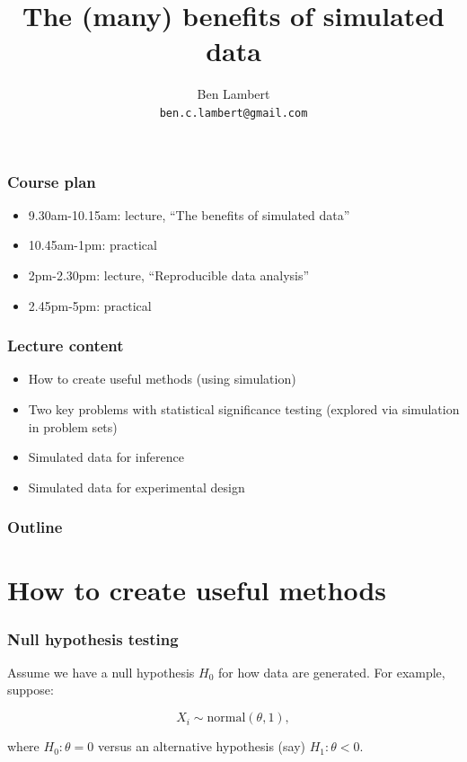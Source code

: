 \documentclass[handout]{beamer}
\title{The (many) benefits of simulated data}
\author[Ben Lambert]{Ben Lambert\inst{1}\\ \texttt{ben.c.lambert@gmail.com}}
\date{\displaydate{date}}
\institute[University of Oxford]{
\inst{1}University of Oxford}
\begin{document}
\begin{frame}
\titlepage
\end{frame}

\begin{frame}
	\frametitle{Course plan}
	\begin{itemize}
		\item 9.30am-10.15am: lecture, ``The benefits of simulated data''
		\item 10.45am-1pm: practical
		\item 2pm-2.30pm: lecture, ``Reproducible data analysis''
		\item 2.45pm-5pm: practical
	\end{itemize}
	
\end{frame}

\begin{frame}
	\frametitle{Lecture content}
	
	\begin{itemize}
		\item How to create useful methods (using simulation)
		\item Two key problems with statistical significance testing (explored via simulation in problem sets)
		\item Simulated data for inference
		\item Simulated data for experimental design
	\end{itemize}
	
\end{frame}

\begin{frame}
	\frametitle{Outline}
	\tableofcontents
\end{frame}

\section{How to create useful methods}
\frame{\tableofcontents[currentsection]}

\begin{frame}
	\frametitle{Null hypothesis testing}
	
	Assume we have a null hypothesis $H_0$ for how data are generated. For example, suppose:
	
	\begin{equation}
	X_i \sim \text{normal}(\theta, 1),
	\end{equation}
	
	where $H_0: \theta=0$ versus an alternative hypothesis (say) $H_1: \theta < 0$.
	
\end{frame}
\end{document}
